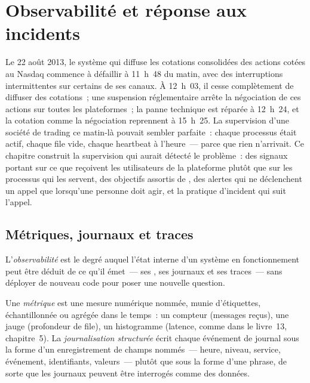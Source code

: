 \chapter{Observabilité et réponse aux incidents}\label{ch:pl:observability-and-incident-response}

Le 22 août 2013, le système qui diffuse les cotations consolidées des actions cotées au Nasdaq commence à défaillir à 11~h~48 du matin, avec
des interruptions intermittentes sur certains de ses canaux. À 12~h~03, il cesse complètement de diffuser des cotations~; une suspension réglementaire arrête la négociation de ces
actions sur toutes les plateformes~; la panne technique est réparée à 12~h~24, et la cotation comme la négociation reprennent à 15~h~25. La supervision
d'une société de trading ce matin-là pouvait sembler parfaite~: chaque processus était actif, chaque file vide, chaque heartbeat à l'heure~--- parce que rien n'arrivait. Ce chapitre construit la
supervision qui aurait détecté le problème~: des signaux portant sur ce que reçoivent les utilisateurs de la plateforme plutôt que sur les processus qui les servent,
des objectifs assortis de , des alertes qui ne déclenchent un appel que lorsqu'une personne doit agir, et la pratique d'incident qui suit l'appel.

\section{Métriques, journaux et traces}

\begin{definition}[Observabilité]\label{def:pl:observability-and-incident-response:observability}
L'\emph{observabilité} est le degré auquel l'état interne d'un système en fonctionnement peut être déduit de
ce qu'il émet~--- ses , ses journaux et ses traces~--- sans déployer de nouveau code pour poser une nouvelle question.
\end{definition}

\begin{definition}\label{def:pl:observability-and-incident-response:metric}
Une \emph{métrique} est une mesure numérique nommée, munie d'étiquettes, échantillonnée ou agrégée dans le temps~: un compteur (messages reçus), une
jauge (profondeur de file), un histogramme (latence, comme dans le livre~13, chapitre~5). La \emph{journalisation structurée} écrit chaque événement de journal
sous la forme d'un enregistrement de champs nommés~--- heure, niveau, service, événement, identifiants, valeurs~--- plutôt que sous la forme d'une phrase, de sorte que les journaux peuvent être interrogés
comme des données.
\end{definition}

